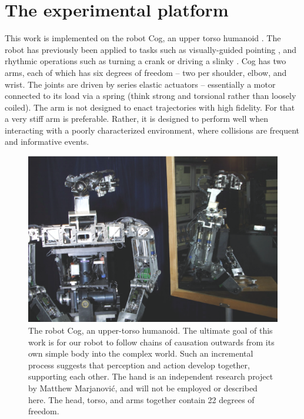 
\section{The experimental platform}

This work is implemented on the robot Cog, an upper torso humanoid
\cite{brooks99cog}.  The robot has previously been applied to tasks
such as visually-guided pointing \cite{Marjanovic-96-SAB}, and
rhythmic operations such as turning a crank or driving a slinky
\cite{williamson98neural}.  Cog has two arms, each of which has six
degrees of freedom -- two per shoulder, elbow, and wrist.  The joints
are driven by series elastic actuators \cite{williamson95series} --
essentially a motor connected to its load via a spring (think strong
and torsional rather than loosely coiled).  The arm is not designed to
enact trajectories with high fidelity.  For that a very stiff arm is
preferable.  Rather, it is designed to perform well when interacting
with a poorly characterized environment, where collisions are frequent
and informative events.

\begin{figure}[tbh]
\centerline{
\includegraphics[width=12cm]{mirror-cog.eps}
}
\caption{ 
%
  The robot Cog, an upper-torso humanoid.  
The ultimate goal of this work is for our robot to follow chains of
causation outwards from its own simple body into the complex world.
Such an incremental process suggests that perception and action
develop together, supporting each other.
\ifverbose
The hand
  is an independent research project by Matthew Marjanovi\'{c}, and
  will not be employed or described here.  
\fi
  The head, torso, and arms
  together contain 22 degrees of freedom.
%
}
\label{fig:cog-schematic}
\end{figure}


